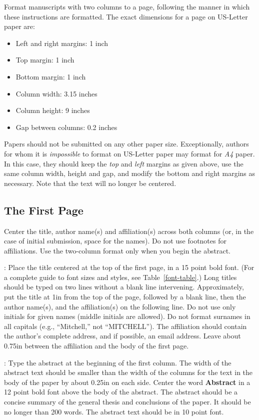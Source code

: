 \documentclass[11pt,letterpaper]{article}
\begin{document}
Format manuscripts with two columns to a page, following the manner in
which these instructions are formatted. The exact dimensions for a page
on US-Letter paper are:

\begin{itemize}
\item Left and right margins: 1 inch
\item Top margin: 1 inch
\item Bottom margin: 1 inch
\item Column width: 3.15 inches
\item Column height: 9 inches
\item Gap between columns: 0.2 inches
\end{itemize}

\noindent Papers should not be submitted on any other paper size.
Exceptionally, authors for whom it is \emph{impossible} to format on
US-Letter paper may format for \emph{A4} paper. In this case, they should
keep the \emph{top} and \emph{left} margins as given above, use the same
column width, height and gap, and modify the bottom and right margins as
necessary. Note that the text will no longer be centered.

\subsection{The First Page}
\label{ssec:first}

Center the title, author name(s) and affiliation(s) across both
columns (or, in the case of initial submission, space for the names). 
Do not use footnotes for affiliations.  
Use the two-column format only when you begin the abstract.

: Place the title centered at the top of the first
page, in a 15 point bold font.  (For a complete guide to font sizes and
styles, see Table~\ref{font-table}.) Long titles should be typed on two
lines without a blank line intervening. Approximately, put the title at
1in from the top of the page, followed by a blank line, then the author
name(s), and the affiliation(s) on the following line.  Do not use only
initials for given names (middle initials are allowed). Do not format
surnames in all capitals (e.g., ``Mitchell,'' not ``MITCHELL'').  The
affiliation should contain the author's complete address, and if possible,
an email address. Leave about 0.75in between the affiliation and the body
of the first page.

: Type the abstract at the beginning of the first
column.  The width of the abstract text should be smaller than the
width of the columns for the text in the body of the paper by about
0.25in on each side.  Center the word {\bf Abstract} in a 12 point
bold font above the body of the abstract. The abstract should be a
concise summary of the general thesis and conclusions of the paper.
It should be no longer than 200 words.  The abstract text should be in
10 point font.
\end{document}
